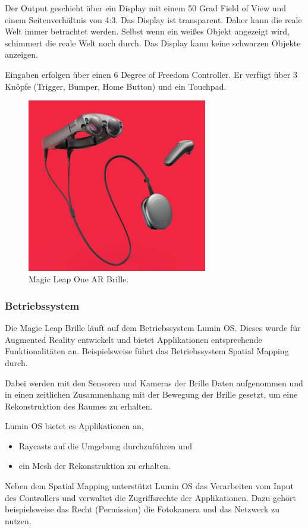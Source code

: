 Der Output geschieht über ein Display mit einem 50 Grad Field of View und einem Seitenverhältnis von 4:3. Das Display ist transparent. Daher kann die reale Welt immer betrachtet werden. Selbst wenn ein weißes Objekt angezeigt wird, schimmert die reale Welt noch durch. 
Das Display kann keine schwarzen Objekte anzeigen. 

Eingaben erfolgen über einen 6 Degree of Freedom Controller. Er verfügt über 3 Knöpfe (Trigger, Bumper, Home Button) und ein Touchpad. \citep{mlofficialsalespitch,mlglossary}

\begin{figure}[H]
	\centering
	\includegraphics[width=0.7\textwidth]{images/img_magicLeap.PNG}
	\caption[]{Magic Leap One AR Brille.\citep{mlImage}}
	\label{magcileap}
\end{figure}

\subsubsection{Betriebssystem}
Die Magic Leap Brille läuft auf dem Betriebssystem Lumin OS. Dieses wurde für Augmented Reality entwickelt und bietet Applikationen entsprechende Funktionalitäten an. Beispielsweise führt das Betriebssystem Spatial Mapping durch.\citep{mlluminOS,mlluminfeatures}

Dabei werden mit den Sensoren und Kameras der Brille Daten aufgenommen und in einen zeitlichen Zusammenhang mit der Bewegung der Brille gesetzt, um eine Rekonstruktion des Raumes zu erhalten.\citep{mlluminOS,mlluminfeatures,mlluminworldreconstruktion,mlmeshingunity}

Lumin OS bietet es Applikationen an,
\begin{itemize}
	\item Raycasts auf die Umgebung durchzuführen und
	\item ein Mesh der Rekonstruktion zu erhalten.
\end{itemize}
Neben dem Spatial Mapping unterstützt Lumin OS das Verarbeiten vom Input des Controllers und verwaltet die Zugriffsrechte der Applikationen. Dazu gehört beispielsweise das Recht (Permission) die Fotokamera und das Netzwerk zu nutzen.\citep{mlluminfeatures,mlappsecurity}


